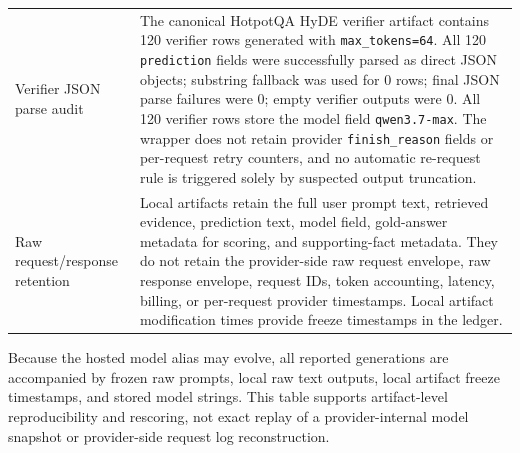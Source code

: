 \begin{table}[t]
\begin{threeparttable}
\begin{tabularx}{\textwidth}{>{\raggedright\arraybackslash}p{}
                            >{\raggedright\arraybackslash}X}
Verifier JSON parse audit & The canonical HotpotQA HyDE verifier artifact contains 120 verifier rows generated with \texttt{max\_tokens=64}. All 120 \texttt{prediction} fields were successfully parsed as direct JSON objects; substring fallback was used for 0 rows; final JSON parse failures were 0; empty verifier outputs were 0. All 120 verifier rows store the model field \texttt{qwen3.7-max}. The wrapper does not retain provider \texttt{finish\_reason} fields or per-request retry counters, and no automatic re-request rule is triggered solely by suspected output truncation. \\
Raw request/response retention & Local artifacts retain the full user prompt text, retrieved evidence, prediction text, model field, gold-answer metadata for scoring, and supporting-fact metadata. They do not retain the provider-side raw request envelope, raw response envelope, request IDs, token accounting, latency, billing, or per-request provider timestamps. Local artifact modification times provide freeze timestamps in the ledger. \\
\bottomrule
\end{tabularx}
\begin{tablenotes}
\footnotesize
\item Because the hosted model alias may evolve, all reported generations are accompanied by frozen raw prompts, local raw text outputs, local artifact freeze timestamps, and stored model strings. This table supports artifact-level reproducibility and rescoring, not exact replay of a provider-internal model snapshot or provider-side request log reconstruction.
\end{tablenotes}
\end{threeparttable}
\end{table}
